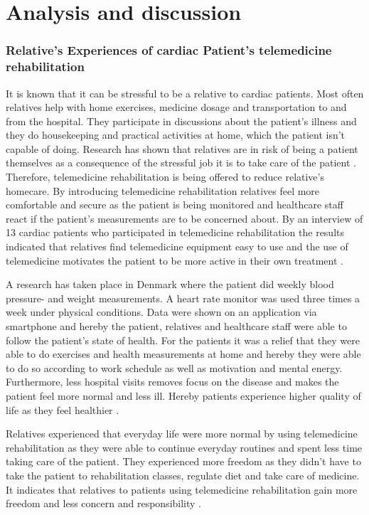 \chapter{Analysis and discussion}

\subsection{Relative’s Experiences of cardiac Patient’s telemedicine rehabilitation}
It is known that it can be stressful to be a relative to cardiac patients. Most often relatives help with home exercises, medicine dosage and transportation to and from the hospital. They participate in discussions about the patient’s illness and they do housekeeping and practical activities at home, which the patient isn't capable of doing. Research has shown that relatives are in risk of being a patient themselves as a consequence of the stressful job it is to take care of the patient \cite{4, 5}. Therefore, telemedicine rehabilitation is being offered to reduce relative’s homecare. By introducing telemedicine rehabilitation relatives feel more comfortable and secure as the patient is being monitored and healthcare staff react if the patient’s measurements are to be concerned about. By an interview of 13 cardiac patients who participated in telemedicine rehabilitation the results indicated that relatives find telemedicine equipment easy to use and the use of telemedicine motivates the patient to be more active in their own treatment \cite{12}.  

A research has taken place in Denmark where the patient did weekly blood pressure- and weight measurements. A heart rate monitor was used three times a week under physical conditions. Data were shown on an application via smartphone and hereby the patient, relatives and healthcare staff were able to follow the patient’s state of health. For the patients it was a relief that they were able to do exercises and health measurements at home and hereby they were able to do so according to work schedule as well as motivation and mental energy. Furthermore, less hospital visits removes focus on the disease and makes the patient feel more normal and less ill. Hereby patients experience higher quality of life as they feel healthier \cite{Bregendahl_2016}.  

Relatives experienced that everyday life were more normal by using telemedicine rehabilitation as they were able to continue everyday routines and spent less time taking care of the patient. They experienced more freedom as they didn’t have to take the patient to rehabilitation classes, regulate diet and take care of medicine. It indicates that relatives to patients using telemedicine rehabilitation gain more freedom and less concern and responsibility \cite{7}.  

